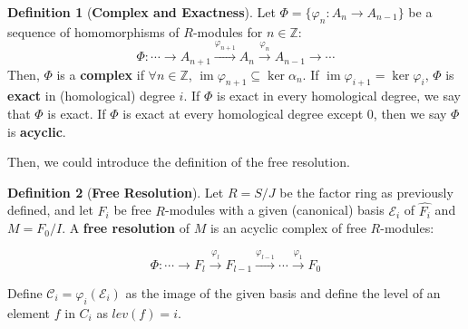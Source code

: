 \documentclass{article}
\newcommand{\im}{\ensuremath{\operatorname{im}}}
\renewcommand{\to}{\ensuremath{\rightarrow}}
\theoremstyle{definition}
\newtheorem{definition}{Definition}[section]
\theoremstyle{remark}
\theoremstyle{example}
\begin{document}
\begin{definition}[\textbf{Complex and Exactness}]
    Let $\Phi = \{\varphi_n : A_n \to A_{n-1}\}$ be a sequence of homomorphisms of $R$-modules for $n \in \mathbb{Z}$: 
    \begin{equation}
        \Phi : \cdots \to A_{n+1} \xrightarrow{\varphi_{n+1}} A_n \xrightarrow{\varphi_n} A_{n-1} \to \cdots 
    \end{equation}
    Then, $\Phi$ is a \textbf{complex} if $\forall n \in \mathbb{Z}$, $\im \varphi_{n+1} \subseteq \ker \alpha_n$.  If $\im \varphi_{i+1} = \ker \varphi_i$, $\Phi$ is \textbf{exact} in (homological) degree $i$.  If $\Phi$ is exact
    in every homological degree, we say that $\Phi$ is exact.  If $\Phi$ is exact at every homological degree except 0, then we say $\Phi$ is \textbf{acyclic}.
\end{definition}

Then, we could introduce the definition of the free resolution.

\begin{definition}[\textbf{Free Resolution}]
    Let $R = S/J$ be the factor ring as previously defined, and let $F_i$ be free $R$-modules with a given (canonical) basis $\mathcal{E}_{i}$ of $\hat{F_i}$ and $M = F_0/I$.  A \textbf{free resolution} of $M$ is an acyclic complex of free $R$-modules:

    \begin{equation}
        \Phi: \cdots \rightarrow F_l \xrightarrow{\varphi_l} F_{l-1} \xrightarrow{\varphi_{l-1}} \cdots \xrightarrow{\varphi_1} F_0
    \end{equation}
    
    Define $\mathcal{C}_i = \varphi_i(\mathcal{E}_i)$ as the image of the given basis and define the level of an element $f$ in $C_i$ as $lev(f) = i$.
\end{definition}
\end{document}
